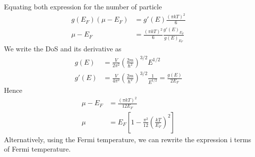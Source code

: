 \documentclass[../../../Main.tex]{subfiles}
\begin{document}
Equating both expression for the number of particle
\begin{align*}
    g(E_F)(\mu-E_F)&=g'(E)\frac{(\pi kT)^2}{6}\\
    \mu-E_F&=\frac{(\pi kT)^2}{6}\frac{g'(E)_{E_F}}{g(E)_{E_F}}
\end{align*}
We write the DoS and its derivative as 
\begin{align*}
    g(E)&=\frac{V}{2\pi^2}\left(\frac{2m}{\hbar^2}\right)^{3/2}E^{1/2}\\
    g'(E)&=\frac{V}{4\pi^2}\left(\frac{2m}{\hbar^2}\right)^{3/2}\frac{1}{E^{1/2}}=\frac{g(E)}{2E_F}
\end{align*}
Hence
\begin{align*}
    \mu-E_F&=\frac{(\pi kT)^2}{12E_F}\\
    \mu&=E_F\left[1-\frac{\pi^2}{12}\left(\frac{kT}{E_F}\right)^2\right]
\end{align*}
Alternatively, using the Fermi temperature, we can rewrite the expression i terms of Fermi temperature.
\end{document}
